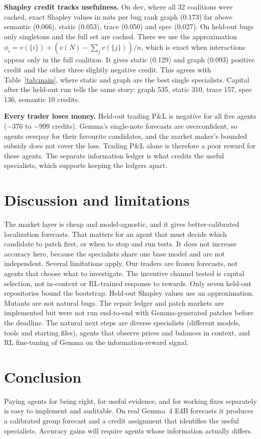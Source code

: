 \documentclass[10pt]{article}
\begin{document}
\textbf{Shapley credit tracks usefulness.} On dev, where all 32 coalitions were cached, exact Shapley values in nats per bug rank graph (0.173) far above semantic (0.066), static (0.053), trace (0.050) and spec (0.027). On held-out bugs only singletons and the full set are cached. There we use the approximation $\phi_i = v(\{i\}) + (v(N) - \sum_j v(\{j\}))/n$, which is exact when interactions appear only in the full coalition. It gives static (0.129) and graph (0.093) positive credit and the other three slightly negative credit. This agrees with Table~\ref{tab:main}, where static and graph are the best single specialists. Capital after the held-out run tells the same story: graph 535, static 310, trace 157, spec 136, semantic 10 credits.

\textbf{Every trader loses money.} Held-out trading P\&L is negative for all five agents ($-376$ to $-999$ credits). Gemma's single-note forecasts are overconfident, so agents overpay for their favourite candidates, and the market maker's bounded subsidy does not cover the loss. Trading P\&L alone is therefore a poor reward for these agents. The separate information ledger is what credits the useful specialists, which supports keeping the ledgers apart.

\section{Discussion and limitations}
The market layer is cheap and model-agnostic, and it gives better-calibrated localization forecasts. That matters for an agent that must decide which candidate to patch first, or when to stop and run tests. It does not increase accuracy here, because the specialists share one base model and are not independent. Several limitations apply. Our traders are frozen forecasts, not agents that choose what to investigate. The incentive channel tested is capital selection, not in-context or RL-trained response to rewards. Only seven held-out repositories bound the bootstrap. Held-out Shapley values use an approximation. Mutants are not natural bugs. The repair ledger and patch markets are implemented but were not run end-to-end with Gemma-generated patches before the deadline. The natural next steps are diverse specialists (different models, tools and starting files), agents that observe prices and balances in context, and RL fine-tuning of Gemma on the information-reward signal.

\section{Conclusion}
Paying agents for being right, for useful evidence, and for working fixes separately is easy to implement and auditable. On real Gemma~4 E4B forecasts it produces a calibrated group forecast and a credit assignment that identifies the useful specialists. Accuracy gains will require agents whose information actually differs.
\end{document}

